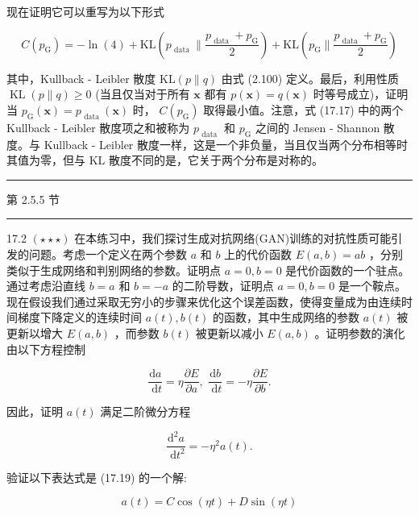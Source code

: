 \documentclass[10pt]{article}
\newcommand{\HRule}{\begin{center}\rule{0.9\linewidth}{0.2mm}\end{center}}
\begin{document}
现在证明它可以重写为以下形式

\[
C\left( {p}_{\mathrm{G}}\right)  =  - \ln \left( 4\right)  + \mathrm{{KL}}\left( {{p}_{\text{ data }}\parallel \frac{{p}_{\text{ data }} + {p}_{\mathrm{G}}}{2}}\right)  + \mathrm{{KL}}\left( {{p}_{\mathrm{G}}\parallel \frac{{p}_{\text{ data }} + {p}_{\mathrm{G}}}{2}}\right)  \tag{17.17}
\]

其中，Kullback - Leibler 散度 \(\mathrm{{KL}}\left( {p\parallel q}\right)\) 由式 (2.100) 定义。最后，利用性质 \(\operatorname{KL}\left( {p\parallel q}\right)  \geq  0\) (当且仅当对于所有 \(\mathbf{x}\) 都有 \(p\left( \mathbf{x}\right)  = q\left( \mathbf{x}\right)\) 时等号成立)，证明当 \({p}_{\mathrm{G}}\left( \mathbf{x}\right)  = {p}_{\text{ data }}\left( \mathbf{x}\right)\) 时， \(C\left( {p}_{\mathrm{G}}\right)\) 取得最小值。注意，式 (17.17) 中的两个 Kullback - Leibler 散度项之和被称为 \({p}_{\text{ data }}\) 和 \({p}_{\mathrm{G}}\) 之间的 Jensen - Shannon 散度。与 Kullback - Leibler 散度一样，这是一个非负量，当且仅当两个分布相等时其值为零，但与 KL 散度不同的是，它关于两个分布是对称的。

\HRule

第 2.5.5 节

\HRule

17.2 \(\left( {\star  \star   \star  }\right)\) 在本练习中，我们探讨生成对抗网络(GAN)训练的对抗性质可能引发的问题。考虑一个定义在两个参数 \(a\) 和 \(b\) 上的代价函数 \(E\left( {a,b}\right)  = {ab}\) ，分别类似于生成网络和判别网络的参数。证明点 \(a = 0,b = 0\) 是代价函数的一个驻点。通过考虑沿直线 \(b = a\) 和 \(b =  - a\) 的二阶导数，证明点 \(a = 0,b = 0\) 是一个鞍点。现在假设我们通过采取无穷小的步骤来优化这个误差函数，使得变量成为由连续时间梯度下降定义的连续时间 \(a\left( t\right) ,b\left( t\right)\) 的函数，其中生成网络的参数 \(a\left( t\right)\) 被更新以增大 \(E\left( {a,b}\right)\) ，而参数 \(b\left( t\right)\) 被更新以减小 \(E\left( {a,b}\right)\) 。证明参数的演化由以下方程控制

\[
\frac{\mathrm{d}a}{\mathrm{\;d}t} = \eta \frac{\partial E}{\partial a},\;\frac{\mathrm{d}b}{\mathrm{\;d}t} =  - \eta \frac{\partial E}{\partial b}. \tag{17.18}
\]

因此，证明 \(a\left( t\right)\) 满足二阶微分方程

\[
\frac{{\mathrm{d}}^{2}a}{\mathrm{\;d}{t}^{2}} =  - {\eta }^{2}a\left( t\right) . \tag{17.19}
\]

验证以下表达式是 (17.19) 的一个解:

\[
a\left( t\right)  = C\cos \left( {\eta t}\right)  + D\sin \left( {\eta t}\right)  \tag{17.20}
\]
\end{document}
